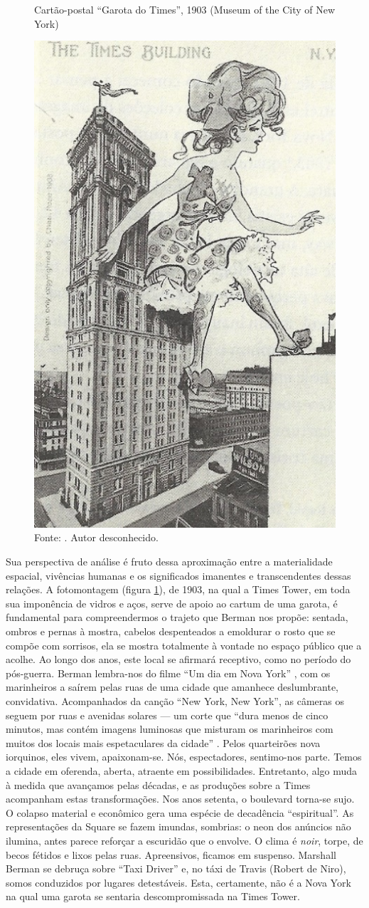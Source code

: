 \begin{refsection}
    \begin{figure}[ht]%
        \centering%
        \caption{Cartão-postal ``Garota do Times'', 1903 (Museum of the City of New York)}%
        \includegraphics[width=.35\textwidth]{articles/15-cidade-em-mapas-text/cartao-postal-nyc.jpeg}%
        \caption*{Fonte: \textcite[p.~12]{Berman2009Seculo}. Autor desconhecido.}%
        \label{fig:cartao-postal-nyc}%
    \end{figure}%

    Sua perspectiva de análise é fruto dessa aproximação entre a materialidade espacial, vivências humanas e os significados imanentes e transcendentes dessas relações. A fotomontagem (figura \ref{fig:cartao-postal-nyc}), de 1903, na qual a Times Tower, em toda sua imponência de vidros e aços, serve de apoio ao cartum de uma garota, é fundamental para compreendermos o trajeto que Berman nos propõe: sentada, ombros e pernas à mostra, cabelos despenteados a emoldurar o rosto que se compõe com sorrisos, ela se mostra totalmente à vontade no espaço público que a acolhe. Ao longo dos anos, este local se afirmará receptivo, como no período do pós-guerra. Berman lembra-nos do filme ``Um dia em Nova York'' \citeyear{KellyAndDonen1949Dia}, com os marinheiros a saírem pelas ruas de uma cidade que amanhece deslumbrante, convidativa. Acompanhados da canção ``New York, New York'', as câmeras os seguem por ruas e avenidas solares --- um corte que ``dura menos de cinco minutos, mas contém imagens luminosas que misturam os marinheiros com muitos dos locais mais espetaculares da cidade'' \cite[p.~141]{Berman2009Seculo}. Pelos quarteirões nova iorquinos, eles vivem, apaixonam-se. Nós, espectadores, sentimo-nos parte. Temos a cidade em oferenda, aberta, atraente em possibilidades. Entretanto, algo muda à medida que avançamos pelas décadas, e as produções sobre a Times acompanham estas transformações. Nos anos setenta, o boulevard torna-se sujo. O colapso material e econômico gera uma espécie de decadência ``espiritual''. As representações da Square se fazem imundas, sombrias: o neon dos anúncios não ilumina, antes parece reforçar a escuridão que o envolve. O clima é \textit{noir}, torpe, de becos fétidos e lixos pelas ruas. Apreensivos, ficamos em suspenso. Marshall Berman se debruça sobre ``Taxi Driver'' \citeyear{Scorsese1976Taxi} e, no táxi de Travis (Robert de Niro), somos conduzidos por lugares detestáveis.  Esta, certamente, não é a Nova York na qual uma garota se sentaria descompromissada na Times Tower. 


\end{refsection}
